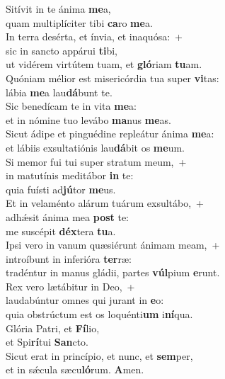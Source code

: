 \evenverse Sitívit in te ánima \textbf{me}a,~\*\\
\evenverse quam multiplíciter tibi \textbf{ca}ro \textbf{me}a.\\
\oddverse In terra desérta, et ínvia, et inaquósa:~+\\
\oddverse  sic in sancto appárui \textbf{ti}bi,~\*\\
\oddverse ut vidérem virtútem tuam, et \textbf{gló}riam \textbf{tu}am.\\
\evenverse Quóniam mélior est misericórdia tua super \textbf{vi}tas:~\*\\
\evenverse lábia \textbf{me}a lau\textbf{dá}bunt te.\\
\oddverse Sic benedícam te in vita \textbf{me}a:~\*\\
\oddverse et in nómine tuo levábo \textbf{ma}nus \textbf{me}as.\\
\evenverse Sicut ádipe et pinguédine repleátur ánima \textbf{me}a:~\*\\
\evenverse et lábiis exsultatiónis lau\textbf{dá}bit os \textbf{me}um.\\
\oddverse Si memor fui tui super stratum meum,~+\\
\oddverse  in matutínis meditábor \textbf{in} te:~\*\\
\oddverse quia fuísti ad\textbf{jú}tor \textbf{me}us.\\
\evenverse Et in velaménto alárum tuárum exsultábo,~+\\
\evenverse  adhǽsit ánima mea \textbf{post} te:~\*\\
\evenverse me suscépit \textbf{déx}tera \textbf{tu}a.\\
\oddverse Ipsi vero in vanum quæsiérunt ánimam meam,~+\\
\oddverse  introíbunt in inferióra \textbf{ter}ræ:~\*\\
\oddverse tradéntur in manus gládii, partes \textbf{vúl}pium \textbf{e}runt.\\
\evenverse Rex vero lætábitur in Deo,~+\\
\evenverse  laudabúntur omnes qui jurant in \textbf{e}o:~\*\\
\evenverse quia obstrúctum est os loquénti\textbf{um} i\textbf{ní}qua.\\
\oddverse Glória Patri, et \textbf{Fí}lio,~\*\\
\oddverse et Spi\textbf{rí}tui \textbf{San}cto.\\
\evenverse Sicut erat in princípio, et nunc, et \textbf{sem}per,~\*\\
\evenverse et in sǽcula sæcu\textbf{ló}rum. \textbf{A}men.\\
